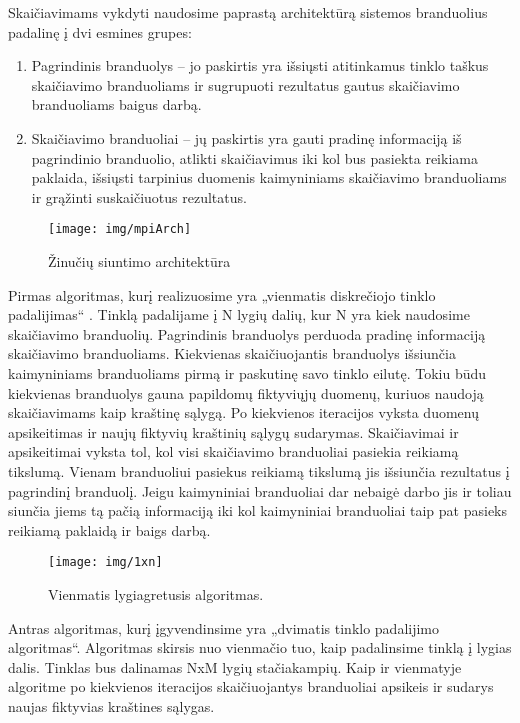 \documentclass{VUMIFPSkursinis}
\begin{document}
Skaičiavimams vykdyti naudosime paprastą architektūrą sistemos branduolius padalinę į dvi esmines grupes:
\begin{enumerate}
\item{Pagrindinis branduolys – jo paskirtis yra išsiųsti atitinkamus tinklo taškus skaičiavimo branduoliams ir sugrupuoti rezultatus gautus skaičiavimo branduoliams baigus darbą.}
\item{Skaičiavimo branduoliai – jų paskirtis yra gauti pradinę informaciją iš pagrindinio branduolio, atlikti skaičiavimus iki kol bus pasiekta reikiama paklaida, išsiųsti tarpinius duomenis kaimyniniams skaičiavimo branduoliams ir grąžinti suskaičiuotus rezultatus.}
\end{enumerate}


\begin{figure}[H]
\centering
\texttt{[image: img/mpiArch]}
\caption{Žinučių siuntimo architektūra} %
\label{img:text}
\end{figure}

Pirmas algoritmas, kurį realizuosime yra „vienmatis diskrečiojo tinklo padalijimas“ \cite{Lygeg}.
Tinklą padalijame į N lygių dalių, kur N yra kiek naudosime skaičiavimo branduolių.
Pagrindinis branduolys perduoda pradinę informaciją skaičiavimo branduoliams.
Kiekvienas skaičiuojantis branduolys išsiunčia kaimyniniams branduoliams pirmą ir paskutinę savo tinklo eilutę. 
Tokiu būdu kiekvienas branduolys gauna papildomų fiktyviųjų duomenų, kuriuos naudoją skaičiavimams kaip kraštinę sąlygą.
Po kiekvienos iteracijos vyksta duomenų apsikeitimas ir naujų fiktyvių kraštinių sąlygų sudarymas.
Skaičiavimai ir apsikeitimai vyksta tol, kol visi skaičiavimo branduoliai pasiekia reikiamą tikslumą.
Vienam branduoliui pasiekus reikiamą tikslumą jis išsiunčia rezultatus į pagrindinį branduolį.
Jeigu kaimyniniai branduoliai dar nebaigė darbo jis ir toliau siunčia jiems tą pačią informaciją iki kol kaimyniniai branduoliai taip pat pasieks reikiamą paklaidą ir baigs darbą.

\begin{figure}[H]
\centering
\texttt{[image: img/1xn]}
\caption{Vienmatis lygiagretusis algoritmas.} %
\label{img:text}
\end{figure}

Antras algoritmas, kurį įgyvendinsime yra „dvimatis tinklo padalijimo algoritmas“.
Algoritmas skirsis nuo vienmačio tuo, kaip padalinsime tinklą į lygias dalis.
Tinklas bus dalinamas NxM lygių stačiakampių.
Kaip ir vienmatyje algoritme po kiekvienos iteracijos skaičiuojantys branduoliai apsikeis ir sudarys naujas fiktyvias kraštines sąlygas.
\end{document}
